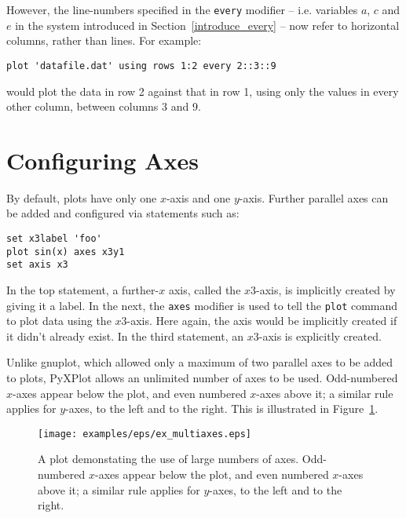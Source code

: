However, the line-numbers specified in the {\tt every} modifier -- i.e.
variables $a$, $c$ and $e$ in the system introduced in
Section~\ref{introduce_every} -- now refer to horizontal columns, rather than
lines. For example:

\begin{verbatim}
plot 'datafile.dat' using rows 1:2 every 2::3::9
\end{verbatim}

\noindent would plot the data in row 2 against that in row 1, using only the
values in every other column, between columns 3 and 9.

\section{Configuring Axes}
\label{axis_extensions}\label{ranges_multiaxes}\label{multiple_axes}

By default, plots have only one $x$-axis and one $y$-axis. Further parallel
axes can be added and configured via statements such as:

\begin{verbatim}
set x3label 'foo'
plot sin(x) axes x3y1
set axis x3
\end{verbatim}

\noindent In the top statement, a further-$x$ axis, called the $x3$-axis, is
implicitly created by giving it a label. In the next, the {\tt axes}
modifier is used to tell the {\tt plot} command to plot data using the
$x3$-axis. Here again, the axis would be implicitly created if it didn't
already exist.  In the third statement, an $x3$-axis is explicitly created.

Unlike gnuplot, which allowed only a maximum of two parallel axes to be added
to plots, PyXPlot allows an unlimited number of axes to be used. Odd-numbered
$x$-axes appear below the plot, and even numbered $x$-axes above it; a similar
rule applies for $y$-axes, to the left and to the right. This is illustrated in
Figure~\ref{fig:ex_multiaxes}.

\begin{figure}
\begin{center}
\texttt{[image: examples/eps/ex\_multiaxes.eps]}
\end{center}
\caption{A plot demonstating the use of large numbers of axes. Odd-numbered
$x$-axes appear below the plot, and even numbered $x$-axes above it; a similar
rule applies for $y$-axes, to the left and to the right.}
\label{fig:ex_multiaxes}
\end{figure}

